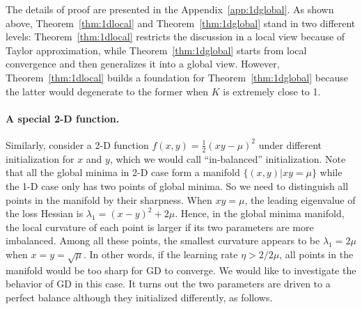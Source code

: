 \documentclass{article}
\theoremstyle{plain}
\theoremstyle{remark}
\newenvironment{sketch}{\paragraph{Proof sketch}}{\hfill$\square$}
\begin{document}

The details of proof are presented in the Appendix~\ref{app:1dglobal}. As shown above, Theorem~\ref{thm:1dlocal} and Theorem~\ref{thm:1dglobal} stand in two different levels: Theorem~\ref{thm:1dlocal} restricts the discussion in a local view because of Taylor approximation, while Theorem~\ref{thm:1dglobal} starts from local convergence and then generalizes it into a global view. However, Theorem~\ref{thm:1dlocal} builds a foundation for Theorem~\ref{thm:1dglobal} because the latter would degenerate to the former when $K$ is extremely close to 1.

\paragraph{A special 2-D function.} Similarly, consider a 2-D function $f(x,y)=\frac{1}{2}(xy-\mu)^2$ under different initialization for $x$ and $y$, which we would call ``in-balanced'' initialization. Note that all the global minima in 2-D case form a manifold $\{(x,y)|xy=\mu\}$ while the 1-D case only has two points of global minima. So we need to distinguish all points in the manifold by their sharpness. When $xy=\mu$, the leading eigenvalue of the loss Hessian is $\lambda_1 = (x-y)^2+2\mu$. Hence, in the global minima manifold, the local curvature of each point is larger if its two parameters are more imbalanced. Among all these points, the smallest curvature appears to be $\lambda_1 = 2\mu$ when $x=y=\sqrt{\mu}$. In other words, if the learning rate $\eta>2/2\mu$, all points in the manifold would be too sharp for GD to converge. We would like to investigate the behavior of GD in this case. It turns out the two parameters are driven to a perfect balance although they initialized differently, as follows.
\end{document}
